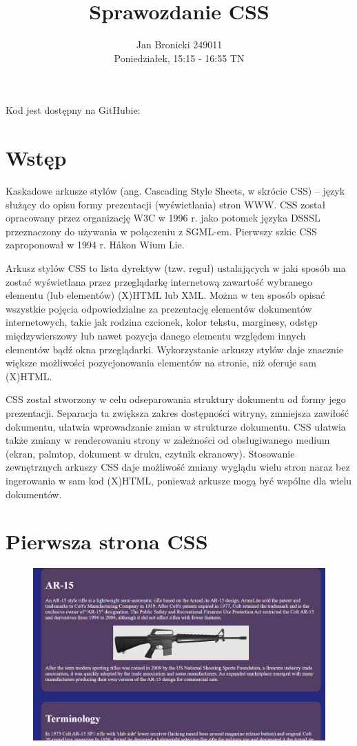 \documentclass{article}
\title{Sprawozdanie CSS}
\author{Jan Bronicki 249011\\Poniedziałek, 15:15 - 16:55 TN}
\date{}
\begin{document}
\maketitle

\begin{center}
    Kod jest dostępny na GitHubie:
    
\end{center}

\section{Wstęp}
Kaskadowe arkusze stylów (ang. Cascading Style Sheets, w skrócie CSS) – język służący do opisu formy prezentacji (wyświetlania) stron WWW. CSS został opracowany przez organizację W3C w 1996 r. jako potomek języka DSSSL przeznaczony do używania w połączeniu z SGML-em. Pierwszy szkic CSS zaproponował w 1994 r. Håkon Wium Lie.

Arkusz stylów CSS to lista dyrektyw (tzw. reguł) ustalających w jaki sposób ma zostać wyświetlana przez przeglądarkę internetową zawartość wybranego elementu (lub elementów) (X)HTML lub XML. Można w ten sposób opisać wszystkie pojęcia odpowiedzialne za prezentację elementów dokumentów internetowych, takie jak rodzina czcionek, kolor tekstu, marginesy, odstęp międzywierszowy lub nawet pozycja danego elementu względem innych elementów bądź okna przeglądarki. Wykorzystanie arkuszy stylów daje znacznie większe możliwości pozycjonowania elementów na stronie, niż oferuje sam (X)HTML.

CSS został stworzony w celu odseparowania struktury dokumentu od formy jego prezentacji. Separacja ta zwiększa zakres dostępności witryny, zmniejsza zawiłość dokumentu, ułatwia wprowadzanie zmian w strukturze dokumentu. CSS ułatwia także zmiany w renderowaniu strony w zależności od obsługiwanego medium (ekran, palmtop, dokument w druku, czytnik ekranowy). Stosowanie zewnętrznych arkuszy CSS daje możliwość zmiany wyglądu wielu stron naraz bez ingerowania w sam kod (X)HTML, ponieważ arkusze mogą być wspólne dla wielu dokumentów.
\section{Pierwsza strona CSS}


\begin{figure}[h!]
    \includegraphics[scale=0.25]{1.png}
    \centering
\end{figure}
\end{document}
